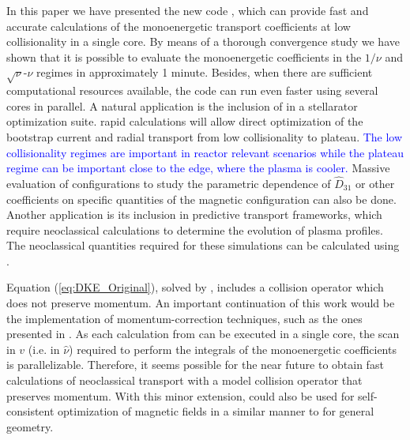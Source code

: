 In this paper we have presented the new code {\MONKES}, which can provide fast and accurate calculations of the monoenergetic transport coefficients at low collisionality in a single core. By means of a thorough convergence study we have shown that it is possible to evaluate the monoenergetic coefficients in the $1/\nu$ and $\sqrt{\nu}$-$\nu$ regimes in approximately 1 minute. Besides, when there are sufficient computational resources available, the code can run even faster using several cores in parallel. A natural application is the inclusion of {\MONKES} in a stellarator optimization suite. {\MONKES} rapid calculations will allow direct optimization of the bootstrap current and radial transport from low collisionality to plateau. \textcolor{blue}{The low collisionality regimes are important in reactor relevant scenarios while the plateau regime can be important close to the edge, where the plasma is cooler.}  Massive evaluation of configurations to study the parametric dependence of $\widehat{D}_{31}$ or other coefficients on specific quantities of the magnetic configuration can also be done. Another application is its inclusion in predictive transport frameworks, which require neoclassical calculations to determine the evolution of plasma profiles. The neoclassical quantities required for these simulations can be calculated using {\MONKES}.


Equation (\ref{eq:DKE_Original}), solved by {\MONKES}, includes a collision operator which does not preserve momentum. An important continuation of this work would be the implementation of momentum-correction techniques, such as the ones presented in \cite{Taguchi,Sugama-PENTA,Sugama2008,MaasbergMomentumCorrection}. As each calculation from {\MONKES} can be executed in a single core, the scan in $v$ (i.e. in $\hat{\nu}$) required to perform the integrals of the monoenergetic coefficients is parallelizable. Therefore, it seems possible for the near future to obtain fast calculations of neoclassical transport with a model collision operator that preserves momentum. With this minor extension, {\MONKES} could also be used for self-consistent optimization of magnetic fields in a similar manner to \cite{Landreman_SelfConsistent} for general geometry. 
 

 





